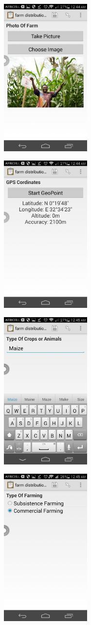 \documentclass{article}
\begin{document}
\graphicspath{{farm/}}
\includegraphics[width = 5cm , height = 8cm ]{1}
\graphicspath{{farm/}}
\includegraphics[width = 5cm , height = 8cm ]{11}
\graphicspath{{farm/}}
\includegraphics[width = 5cm , height = 8cm ]{111}
\graphicspath{{farm/}}
\includegraphics[width = 5cm , height = 8cm ]{1111}
\end{document}
